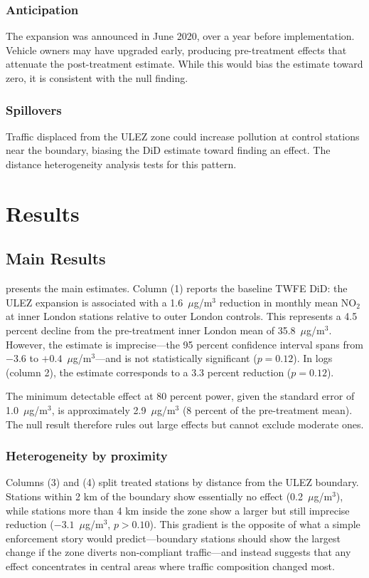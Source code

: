 \documentclass[12pt]{article}
\begin{document}
\subsubsection*{Anticipation} The expansion was announced in June 2020, over a year before implementation. Vehicle owners may have upgraded early, producing pre-treatment effects that attenuate the post-treatment estimate. While this would bias the estimate toward zero, it is consistent with the null finding.

\subsubsection*{Spillovers} Traffic displaced from the ULEZ zone could increase pollution at control stations near the boundary, biasing the DiD estimate toward finding an effect. The distance heterogeneity analysis tests for this pattern.


\section{Results}

\subsection{Main Results}



 presents the main estimates. Column (1) reports the baseline TWFE DiD: the ULEZ expansion is associated with a 1.6~$\mu$g/m$^3$ reduction in monthly mean NO$_2$ at inner London stations relative to outer London controls. This represents a 4.5 percent decline from the pre-treatment inner London mean of 35.8~$\mu$g/m$^3$. However, the estimate is imprecise---the 95 percent confidence interval spans from $-3.6$ to $+0.4$~$\mu$g/m$^3$---and is not statistically significant ($p = 0.12$). In logs (column 2), the estimate corresponds to a 3.3 percent reduction ($p = 0.12$).

The minimum detectable effect at 80 percent power, given the standard error of 1.0~$\mu$g/m$^3$, is approximately 2.9~$\mu$g/m$^3$ (8 percent of the pre-treatment mean). The null result therefore rules out large effects but cannot exclude moderate ones.

\subsubsection*{Heterogeneity by proximity} Columns (3) and (4) split treated stations by distance from the ULEZ boundary. Stations within 2 km of the boundary show essentially no effect (0.2~$\mu$g/m$^3$), while stations more than 4 km inside the zone show a larger but still imprecise reduction ($-3.1$~$\mu$g/m$^3$, $p > 0.10$). This gradient is the opposite of what a simple enforcement story would predict---boundary stations should show the largest change if the zone diverts non-compliant traffic---and instead suggests that any effect concentrates in central areas where traffic composition changed most.
\end{document}
